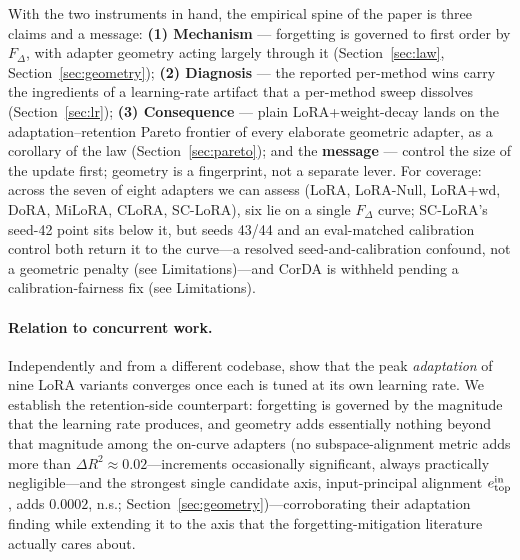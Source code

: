 \documentclass[11pt]{article}
\newcommand{\dw}{F_{\Delta}}
\begin{document}
With the two instruments in hand, the empirical spine of the paper is three claims
and a message: \textbf{(1) Mechanism} --- forgetting is governed to first order by
$\dw$, with adapter geometry acting largely through it (Section~\ref{sec:law},
Section~\ref{sec:geometry}); \textbf{(2) Diagnosis} --- the reported
per-method wins carry the ingredients of a learning-rate artifact that a
per-method sweep dissolves (Section~\ref{sec:lr}); \textbf{(3) Consequence} ---
plain LoRA{+}weight-decay lands on the adaptation--retention Pareto frontier of
every elaborate geometric adapter, as a corollary of the law
(Section~\ref{sec:pareto}); and the \textbf{message} --- control the size of the
update first; geometry is a fingerprint, not a separate lever. For coverage:
across the seven of eight adapters we can assess
(LoRA, LoRA-Null, LoRA{+}wd, DoRA, MiLoRA, CLoRA, SC-LoRA), six lie on a single
$\dw$ curve; SC-LoRA's seed-42 point sits below it, but seeds 43/44 and an
eval-matched calibration control both return it to the curve---a resolved
seed-and-calibration confound, not a geometric penalty
(see Limitations)---and CorDA is
withheld pending a calibration-fairness fix (see Limitations).

\paragraph{Relation to concurrent work.} Independently and from a different
codebase, \citet{lee2026lr} show that the peak \emph{adaptation} of nine LoRA
variants converges once each is tuned at its own learning rate. We establish the
retention-side counterpart: forgetting is governed by the magnitude that the
learning rate produces, and geometry adds essentially nothing beyond that magnitude
among the on-curve adapters (no subspace-alignment metric adds more than
$\Delta R^2\!\approx\!0.02$---increments occasionally significant, always
practically negligible---and the strongest single candidate axis, input-principal
alignment $e^{\rm in}_{\rm top}$, adds $0.0002$, n.s.;
Section~\ref{sec:geometry})---corroborating their adaptation finding while extending
it to the axis that the forgetting-mitigation literature actually cares about.
\end{document}
